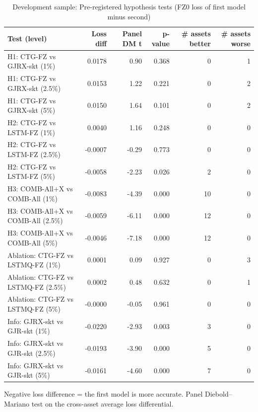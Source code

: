 \begin{table}[htbp]
\centering
\footnotesize
\caption{Development sample: Pre-registered hypothesis tests (FZ0 loss of first model minus second)}
\label{tab:dev_hyp}
\begin{tabular}{lrrrrr}
\toprule
Test (level) & Loss diff & Panel DM t & p-value & \# assets better & \# assets worse \\
\midrule
H1: CTG-FZ vs GJRX-skt (1\%) & 0.0178 & 0.90 & 0.368 & 0 & 1 \\
H1: CTG-FZ vs GJRX-skt (2.5\%) & 0.0153 & 1.22 & 0.221 & 0 & 2 \\
H1: CTG-FZ vs GJRX-skt (5\%) & 0.0150 & 1.64 & 0.101 & 0 & 2 \\
H2: CTG-FZ vs LSTM-FZ (1\%) & 0.0040 & 1.16 & 0.248 & 0 & 0 \\
H2: CTG-FZ vs LSTM-FZ (2.5\%) & -0.0007 & -0.29 & 0.773 & 0 & 0 \\
H2: CTG-FZ vs LSTM-FZ (5\%) & -0.0058 & -2.23 & 0.026 & 2 & 0 \\
H3: COMB-All+X vs COMB-All (1\%) & -0.0083 & -4.39 & 0.000 & 10 & 0 \\
H3: COMB-All+X vs COMB-All (2.5\%) & -0.0059 & -6.11 & 0.000 & 12 & 0 \\
H3: COMB-All+X vs COMB-All (5\%) & -0.0046 & -7.18 & 0.000 & 12 & 0 \\
Ablation: CTG-FZ vs LSTMQ-FZ (1\%) & 0.0001 & 0.09 & 0.927 & 0 & 3 \\
Ablation: CTG-FZ vs LSTMQ-FZ (2.5\%) & 0.0002 & 0.48 & 0.632 & 0 & 1 \\
Ablation: CTG-FZ vs LSTMQ-FZ (5\%) & -0.0000 & -0.05 & 0.961 & 0 & 0 \\
Info: GJRX-skt vs GJR-skt (1\%) & -0.0220 & -2.93 & 0.003 & 3 & 0 \\
Info: GJRX-skt vs GJR-skt (2.5\%) & -0.0193 & -3.90 & 0.000 & 5 & 0 \\
Info: GJRX-skt vs GJR-skt (5\%) & -0.0161 & -4.60 & 0.000 & 7 & 0 \\
\bottomrule
\end{tabular}
\par\smallskip\parbox{\linewidth}{\scriptsize Negative loss difference = the first model is more accurate. Panel Diebold--Mariano test on the cross-asset average loss differential.}
\end{table}
